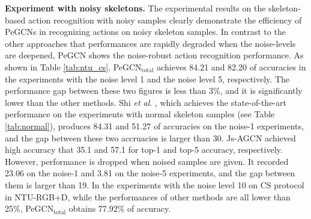 \documentclass[runningheads]{llncs}
\newcommand{\etal}{\textit{et al}. }
\begin{document}
\textbf{Experiment with noisy skeletons.} The experimental results on the skeleton-based action recognition with noisy samples clearly demonstrate the efficiency of PeGCNs in recognizing actions on noisy skeleton samples. In contrast to the other approaches that performances are rapidly degraded when the noise-levels are deepened, PeGCN shows the noise-robust action recognition performance. As shown in Table \ref{tab:ntu_cs}, PeGCN$_{\text{total}}$ achieves 84.21 and 82.20 of accuracies in the experiments with the noise level 1 and the noise level 5, respectively. The performance gap between these two figures is less than 3\%, and it is significantly lower than the other methods. Shi \etal \cite{shi2019two}, which achieves the state-of-the-art performance on the experiments with normal skeleton samples (see Table \ref{tab:normal}), produces 84.31 and 51.27 of accuracies on the noise-1 experiments, and the gap between these two accruacies is larger than 30. Js-AGCN \cite{shi2019two} achieved high accuracy that 35.1 and 57.1 for top-1 and top-5 accuracy, respectively. However, performance is dropped when noised samples are given. It recorded 23.06 on the noise-1 and 3.81 on the noise-5 experiments, and the gap between them is larger than 19. In the experiments with the noise level 10 on CS protocol in NTU-RGB+D, while the performances of other methods are all lower than 25\%, PeGCN$_{\text{total}}$ obtains 77.92\% of accuracy.
\end{document}
